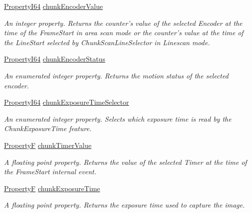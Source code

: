 \begin{DoxyCompactItemize}
\hyperlink{group___common_interface_ga81749b2696755513663492664a18a893}{Property\+I64} \hyperlink{classmv_i_m_p_a_c_t_1_1acquire_1_1_gen_i_cam_1_1_chunk_data_control_a9483a862178c537ba676b62bd51a5711}{chunk\+Encoder\+Value}
\begin{DoxyCompactList}\small\item\em An integer property. Returns the counter's value of the selected Encoder at the time of the Frame\+Start in area scan mode or the counter's value at the time of the Line\+Start selected by Chunk\+Scan\+Line\+Selector in Linescan mode. \end{DoxyCompactList}\item 
\hyperlink{group___common_interface_ga81749b2696755513663492664a18a893}{Property\+I64} \hyperlink{classmv_i_m_p_a_c_t_1_1acquire_1_1_gen_i_cam_1_1_chunk_data_control_a1e3efd94e47ad8ea76c4ad05a91fc208}{chunk\+Encoder\+Status}
\begin{DoxyCompactList}\small\item\em An enumerated integer property. Returns the motion status of the selected encoder. \end{DoxyCompactList}\item 
\hyperlink{group___common_interface_ga81749b2696755513663492664a18a893}{Property\+I64} \hyperlink{classmv_i_m_p_a_c_t_1_1acquire_1_1_gen_i_cam_1_1_chunk_data_control_a54579ccb17b4adfac634b977c5a97341}{chunk\+Exposure\+Time\+Selector}
\begin{DoxyCompactList}\small\item\em An enumerated integer property. Selects which exposure time is read by the Chunk\+Exposure\+Time feature. \end{DoxyCompactList}\item 
\hyperlink{group___common_interface_gaf54865fe5a3d5cfd15f9a111b40d09f9}{Property\+F} \hyperlink{classmv_i_m_p_a_c_t_1_1acquire_1_1_gen_i_cam_1_1_chunk_data_control_a5b634696877e47f3c773da528d1c8f90}{chunk\+Timer\+Value}
\begin{DoxyCompactList}\small\item\em A floating point property. Returns the value of the selected Timer at the time of the Frame\+Start internal event. \end{DoxyCompactList}\item 
\hyperlink{group___common_interface_gaf54865fe5a3d5cfd15f9a111b40d09f9}{Property\+F} \hyperlink{classmv_i_m_p_a_c_t_1_1acquire_1_1_gen_i_cam_1_1_chunk_data_control_a111bfcd0b354e55b9a54ffbb1a9d5299}{chunk\+Exposure\+Time}
\begin{DoxyCompactList}\small\item\em A floating point property. Returns the exposure time used to capture the image. \end{DoxyCompactList}\item 

\end{DoxyCompactItemize}
